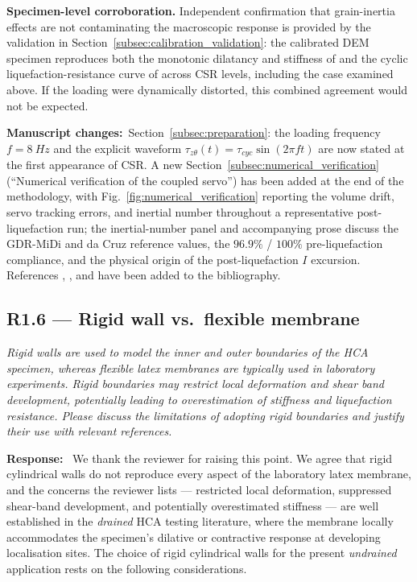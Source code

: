 \documentclass[11pt,a4paper]{article}
\newenvironment{rcomment}
  {\begin{leftbar}\color{black!75}\itshape}
  {\end{leftbar}\vspace{0.3em}}
\newcommand{\response}{\par\noindent\textbf{Response:}\ \ignorespaces}
\newcommand{\changed}[1]{\par\noindent\textbf{Manuscript changes:}\ #1\par}
\begin{document}
\medskip
\noindent\textbf{Specimen-level corroboration.}
Independent confirmation that grain-inertia effects are not
contaminating the macroscopic response is provided by the validation
in Section~\ref{subsec:calibration_validation}: the calibrated DEM
specimen reproduces both the monotonic dilatancy and stiffness of
\citet{Nakata1998} and the cyclic liquefaction-resistance curve of
\citet{Ishihara1985} across CSR levels, including the case examined
above. If the loading were dynamically distorted, this combined
agreement would not be expected.

\changed{Section~\ref{subsec:preparation}: the loading frequency
$f=\SI{8}{Hz}$ and the explicit waveform
$\tau_{z\theta}(t)=\tau_{cyc}\sin(2\pi f t)$ are now stated at the
first appearance of CSR. A new
Section~\ref{subsec:numerical_verification} (``Numerical verification
of the coupled servo'') has been added at the end of the methodology,
with Fig.~\ref{fig:numerical_verification} reporting the volume drift,
servo tracking errors, and inertial number throughout a representative
post-liquefaction run; the inertial-number panel and accompanying
prose discuss the GDR-MiDi and da Cruz reference values, the
$96.9\%$ / $100\%$ pre-liquefaction compliance, and the physical
origin of the post-liquefaction $I$ excursion. References
\citet{GDRMiDi2004}, \citet{daCruzEmam2005}, and
\citet{Wang2025inertial} have been added to the bibliography.}

\FloatBarrier

\subsection*{R1.6 --- Rigid wall vs.\ flexible membrane}

\begin{rcomment}
Rigid walls are used to model the inner and outer boundaries of the HCA
specimen, whereas flexible latex membranes are typically used in laboratory
experiments. Rigid boundaries may restrict local deformation and shear band
development, potentially leading to overestimation of stiffness and
liquefaction resistance. Please discuss the limitations of adopting rigid
boundaries and justify their use with relevant references.
\end{rcomment}

\response
We thank the reviewer for raising this point. We agree that rigid
cylindrical walls do not reproduce every aspect of the laboratory
latex membrane, and the concerns the reviewer lists --- restricted
local deformation, suppressed shear-band development, and potentially
overestimated stiffness --- are well established in the \emph{drained}
HCA testing literature, where the membrane locally accommodates the
specimen's dilative or contractive response at developing localisation
sites. The choice of rigid cylindrical walls for the present
\emph{undrained} application rests on the following considerations.
\end{document}
